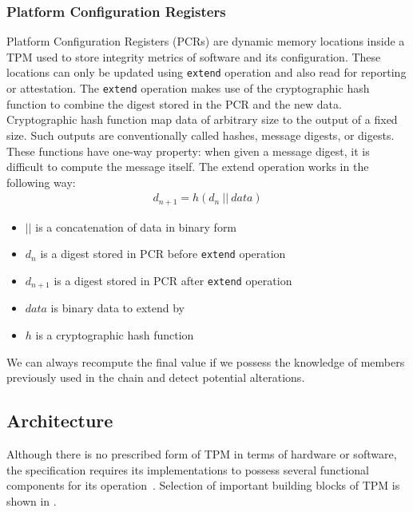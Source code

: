 \subsubsection{Platform Configuration Registers}\label{sec:pcr}
Platform Configuration Registers (PCRs) are dynamic memory locations inside a TPM used to store integrity metrics of software and its configuration. These locations can only be updated using \texttt{extend} operation and also read for reporting or attestation. The \texttt{extend} operation makes use of the cryptographic hash function to combine the digest stored in the PCR and the new data. Cryptographic hash function map data of arbitrary size to the output of a fixed size. Such outputs are conventionally called hashes, message digests, or digests. These functions have one-way property: when given a message digest, it is difficult  to compute the message itself. The extend operation works in the following way:
\begin{align*}
    d_{n+1} = h(d_{n}\ ||\ data)
\end{align*}
\begin{itemize}
    \item $||$ is a concatenation of data in binary form
    \item $ d_{n} $ is a digest stored in PCR before \texttt{extend} operation
    \item $ d_{n+1} $ is a digest stored in PCR after \texttt{extend} operation
    \item $ data $ is binary data to extend by
    \item $ h $ is a cryptographic hash function
\end{itemize}

We can always recompute the final value if we possess the knowledge of members previously used in the chain and detect potential alterations.




\subsection{Architecture}
Although there is no prescribed form of TPM in terms of hardware or software, the specification requires its implementations to possess several functional components for its operation~\cite{tcg_p1_architecture}. Selection of important building blocks of TPM is shown in .

